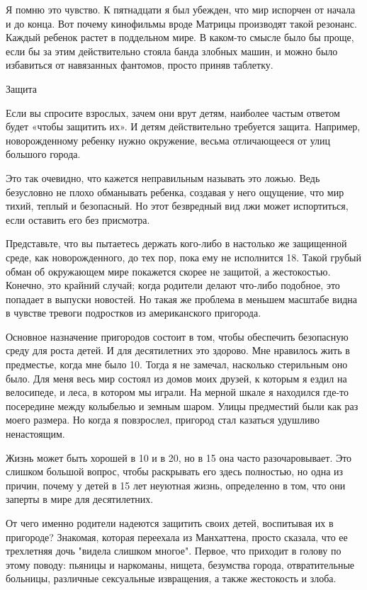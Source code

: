 \documentclass[ebook,12pt,oneside,openany]{memoir}
\begin{document}
Я помню это чувство. К пятнадцати я был убежден, что мир испорчен от
начала и до конца. Вот почему кинофильмы вроде Матрицы производят
такой резонанс. Каждый ребенок растет в поддельном мире. В каком-то
смысле было бы проще, если бы за этим действительно стояла банда
злобных машин, и можно было избавиться от навязанных фантомов, просто
приняв таблетку.

Защита

Если вы спросите взрослых, зачем они врут детям, наиболее частым
ответом будет «чтобы защитить их». И детям действительно требуется
защита. Например, новорожденному ребенку нужно окружение, весьма
отличающееся от улиц большого города.

Это так очевидно, что кажется неправильным называть это ложью. Ведь
безусловно не плохо обманывать ребенка, создавая у него ощущение, что
мир тихий, теплый и безопасный. Но этот безвредный вид лжи может
испортиться, если оставить его без присмотра.

Представьте, что вы пытаетесь держать кого-либо в настолько же
защищенной среде, как новорожденного, до тех пор, пока ему не
исполнится 18. Такой грубый обман об окружающем мире покажется скорее
не защитой, а жестокостью. Конечно, это крайний случай; когда родители
делают что-либо подобное, это попадает в выпуски новостей. Но такая же
проблема в меньшем масштабе видна в чувстве тревоги подростков из
американского пригорода.

Основное назначение пригородов состоит в том, чтобы обеспечить
безопасную среду для роста детей. И для десятилетних это здорово. Мне
нравилось жить в предместье, когда мне было 10. Тогда я не замечал,
насколько стерильным оно было. Для меня весь мир состоял из домов моих
друзей, к которым я ездил на велосипеде, и леса, в котором мы играли.
На мерной шкале я находился где-то посередине между колыбелью и земным
шаром. Улицы предместий были как раз моего размера. Но когда я
повзрослел, пригород стал казаться удушливо ненастоящим.

Жизнь может быть хорошей в 10 и в 20, но в 15 она часто
разочаровывает. Это слишком большой вопрос, чтобы раскрывать его здесь
полностью, но одна из причин, почему у детей в 15 лет неуютная жизнь,
определенно в том, что они заперты в мире для десятилетних.

От чего именно родители надеются защитить своих детей, воспитывая их в
пригороде? Знакомая, которая переехала из Манхаттена, просто сказала,
что ее трехлетняя дочь "видела слишком многое". Первое, что приходит в
голову по этому поводу: пьяницы и наркоманы, нищета, безумства города,
отвратительные больницы, различные сексуальные извращения, а также
жестокость и злоба.
\end{document}
